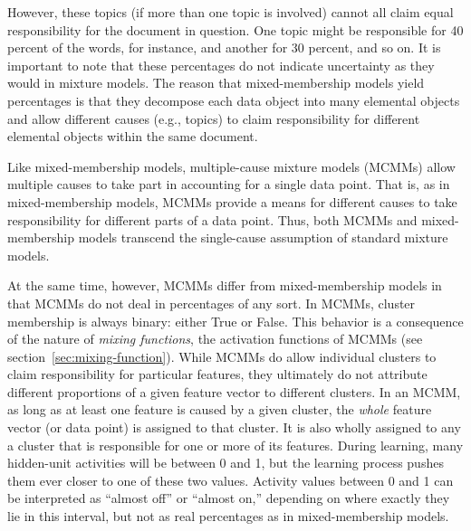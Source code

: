 However, these topics (if more than one topic is involved) cannot all claim equal responsibility
for the document in question. One topic might be responsible for 40 percent of the words, for instance, 
and another for 30 percent, and so on. 
It is important to note that these percentages 
do not indicate uncertainty as they would in mixture models. 
The reason that mixed-membership models yield percentages is 
that they decompose each data object into many elemental objects and allow different 
causes (e.g., topics) to claim responsibility for different 
elemental objects within the same document. 

Like mixed-membership models, multiple-cause mixture models (MCMMs) 
allow multiple causes to take part in accounting for a single data point. 
That is, as in mixed-membership models, MCMMs provide a means for 
different causes to take responsibility for different parts of a data point. 
Thus, both MCMMs and mixed-membership models transcend the single-cause assumption of standard 
mixture models.

At the same time, however, MCMMs differ from mixed-membership models in that MCMMs do not deal in 
percentages of any sort.
In MCMMs, 
cluster membership is always binary: either True or False. %
This behavior is a consequence of the nature of \emph{mixing functions}, the activation functions of MCMMs (see section~\ref{sec:mixing-function}). 
While MCMMs do allow individual clusters to claim responsibility 
for particular features, they ultimately do not attribute different proportions of a given feature vector
to different clusters. In an MCMM, as long as at least one feature is caused by a given cluster, the \emph{whole} feature
vector (or data point) is assigned to that cluster. It is also wholly assigned to any a cluster that is responsible for one or more of its features. 
During learning, many hidden-unit activities will be between 0 and 1,
but the learning process pushes them ever closer to one of these two values. 
Activity values between 0 and 1 can be interpreted as ``almost off'' or ``almost on,'' depending on where exactly they lie in this interval,
but not as real percentages as in mixed-membership models. 

